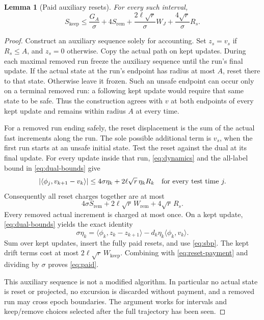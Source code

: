 \documentclass[11pt]{article}
\newtheorem{lemma}[theorem]{Lemma}
\theoremstyle{remark}
\newcommand{\ip}[2]{\langle #1,#2\rangle}
\begin{document}
\begin{lemma}[Paid auxiliary resets]\label{lem:paid}
For every such interval,
\begin{equation}\label{eq:paid}
 S_{\mathrm{keep}}\le\frac{G_A}{\sigma}+4S_{\mathrm{rem}}
       +\frac{2\ell\sqrt r}{\sigma}W_J
       +\frac{4\sqrt r}{\sigma}R_s.
\end{equation}
\end{lemma}
\begin{proof}
Construct an auxiliary sequence solely for accounting. Set $z_s=v_s$
if $R_s\le A$, and $z_s=0$ otherwise. Copy the actual path on kept
updates. During each maximal removed run freeze the auxiliary sequence
until the run's final update. If the actual state at the run's endpoint
has radius at most $A$, reset there to that state. Otherwise leave it
frozen. Such an unsafe endpoint can occur only on a terminal removed
run: a following kept update would require that same state to be safe.
Thus the construction agrees with $v$ at both endpoints of every kept
update and remains within radius $A$ at every time.

For a removed run ending safely, the reset displacement is the sum of
the actual fast increments along the run. The sole possible additional
term is $v_s$, when the first run starts at an unsafe initial state.
Test the reset against the dual at its final update. For every update
inside that run, \eqref{eq:dynamics} and the all-label bound in
\eqref{eq:dual-bounds} give
\[
 |\ip{\phi_j}{v_{k+1}-v_k}|
 \le4\sigma\eta_k+2\ell\sqrt r\,\eta_kR_k
 \quad\hbox{for every test time }j.
\]
Consequently all reset charges together are at most
\begin{equation}\label{eq:reset-payment}
 4\sigma S_{\mathrm{rem}}+2\ell\sqrt r\,W_{\mathrm{rem}}
       +4\sqrt r\,R_s.
\end{equation}
Every removed actual increment is charged at most once. On a kept
update, \eqref{eq:dual-bounds} yields the exact identity
\[
 \sigma\eta_k=\ip{\phi_k}{z_k-z_{k+1}}
                  -d_k\eta_k\ip{\phi_k}{v_k}.
\]
Sum over kept updates, insert the fully paid resets, and use
\eqref{eq:sbp}. The kept drift terms cost at most
$2\ell\sqrt r\,W_{\mathrm{keep}}$. Combining with
\eqref{eq:reset-payment} and dividing by $\sigma$ proves
\eqref{eq:paid}.

This auxiliary sequence is not a modified algorithm. In particular no
actual state is reset or projected, no excursion is discarded without
payment, and a removed run may cross epoch boundaries. The argument
works for intervals and keep/remove choices selected after the full
trajectory has been seen.
\end{proof}
\end{document}

